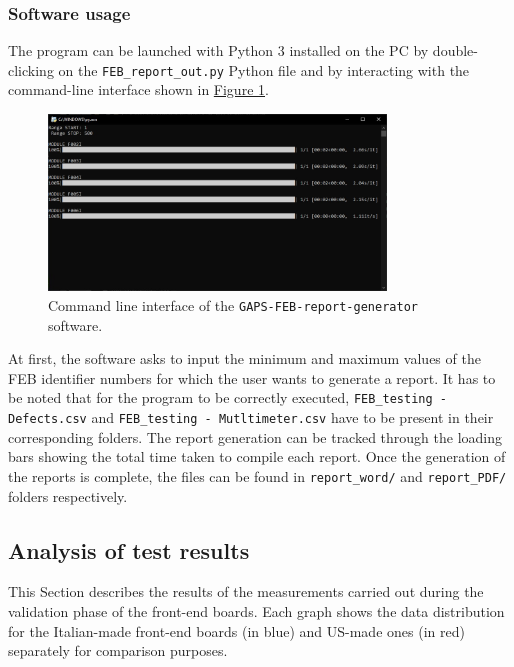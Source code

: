\subsubsection{Software usage}
The program can be launched with Python 3 installed on the PC by double-clicking on the \texttt{FEB\_report\_out.py} Python file and by interacting with the command-line interface shown in \hyperref[figReportTerminal]{Figure \ref{figReportTerminal}}.

\begin{figure}[h!]
    \centering
    \includegraphics[width=0.8\textwidth]{Images/chap2/rep_gen_terminal.jpg}
    \caption{Command line interface of the \texttt{GAPS-FEB-report-generator} software.}
    \label{figReportTerminal}
\end{figure}

\par
At first, the software asks to input the minimum and maximum values of the FEB identifier numbers for which the user wants to generate a report. It has to be noted that for the program to be correctly executed, \texttt{FEB\_testing - Defects.csv} and \texttt{FEB\_testing - Mutltimeter.csv} have to be present in their corresponding folders. The report generation can be tracked through the loading bars showing the total time taken to compile each report. Once the generation of the reports is complete, the files can be found in \texttt{report\_word/} and \texttt{report\_PDF/} folders respectively.



\subsection{Analysis of test results} \label{FEBresults}

This Section describes the results of the measurements carried out during the validation phase of the front-end boards. Each graph shows the data distribution for the Italian-made front-end boards (in blue) and US-made ones (in red) separately for comparison purposes. 

